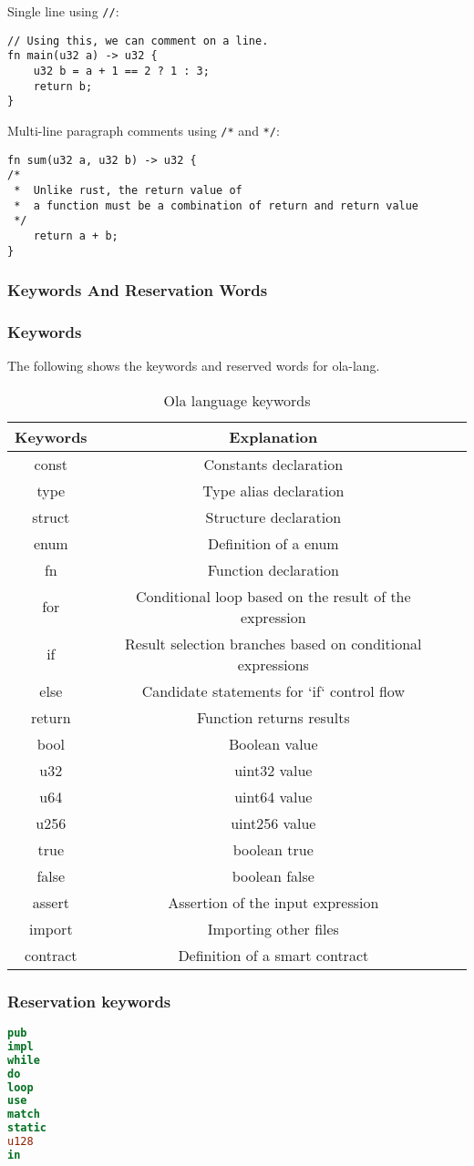 Single line using \texttt{//}:
\begin{lstlisting}
// Using this, we can comment on a line.
fn main(u32 a) -> u32 {
    u32 b = a + 1 == 2 ? 1 : 3;
    return b;
}
\end{lstlisting}

Multi-line paragraph comments using \texttt{/*} and \texttt{*/}:
\begin{lstlisting}
fn sum(u32 a, u32 b) -> u32 {
/* 
 *  Unlike rust, the return value of 
 *  a function must be a combination of return and return value
 */
    return a + b;
}
\end{lstlisting}



\subsubsection{Keywords And Reservation Words}

\subsubsection*{Keywords} 

The following  shows the keywords and reserved words for ola-lang.

\begin{table}[!ht]
\centering
\begin{tabular}{c|c|c}
\textbf{Keywords} & \textbf{Explanation} \\ \hline
const & Constants declaration \\
type & Type alias declaration \\
struct & Structure declaration \\
enum & Definition of a enum \\
fn & Function declaration \\
for & Conditional loop based on the result of the expression \\
if & Result selection branches based on conditional expressions \\
else & Candidate statements for `if` control flow \\
return & Function returns results \\
bool & Boolean value \\
u32 & uint32 value \\
u64 & uint64 value \\
u256 & uint256 value \\
true & boolean true \\
false & boolean false \\
assert & Assertion of the input expression \\
import & Importing other files \\
contract & Definition of a smart contract \\
\end{tabular}
\caption{Ola language keywords}
\label{table: ola-lang-keywords}
\end{table}

\subsubsection*{Reservation keywords}

\begin{lstlisting}[language=Rust]
pub
impl
while
do
loop
use
match
static
u128
in
\end{lstlisting}
    